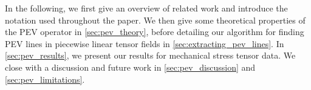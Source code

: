 %
In the following, we first give an overview of related work and introduce the
notation used throughout the paper.
%
We then give some theoretical properties of the \ac{PEV} operator in
\autoref{sec:pev_theory}, before detailing our algorithm for finding \ac{PEV} lines in
piecewise linear tensor fields in \autoref{sec:extracting_pev_lines}.
%
In \autoref{sec:pev_results}, we present our results for mechanical stress tensor
data.
%
We close with a discussion and future work in \autoref{sec:pev_discussion} and
\autoref{sec:pev_limitations}.
%
\begin{figure}[t]
    \centering
\end{figure}
